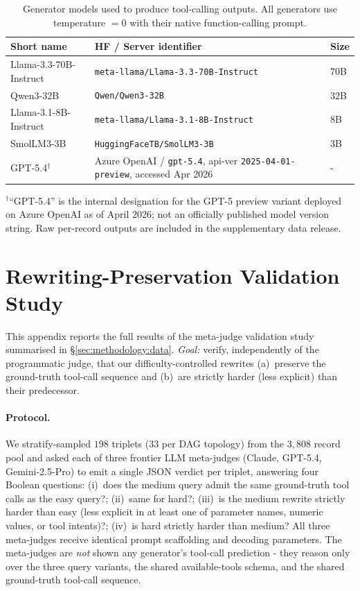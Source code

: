 \begin{table}[!htbp]
\centering
\caption{Generator models used to produce tool-calling outputs. All generators use temperature $=0$ with their native function-calling prompt.}
\label{tab:generators}
\small
\renewcommand{\arraystretch}{1.1}
\setlength{\tabcolsep}{5pt}
\begin{tabular}{@{}lll@{}}
\toprule
\textbf{Short name} & \textbf{HF / Server identifier} & \textbf{Size} \\
\midrule
Llama-3.3-70B-Instruct & \texttt{meta-llama/Llama-3.3-70B-Instruct} & 70B \\
Qwen3-32B              & \texttt{Qwen/Qwen3-32B}                   & 32B \\
Llama-3.1-8B-Instruct  & \texttt{meta-llama/Llama-3.1-8B-Instruct} & 8B  \\
SmolLM3-3B             & \texttt{HuggingFaceTB/SmolLM3-3B}         & 3B  \\
GPT-5.4$^{\dagger}$    & Azure OpenAI / \texttt{gpt-5.4}, api-ver \texttt{2025-04-01-preview}, accessed Apr 2026 & - \\
\bottomrule
\end{tabular}
\begin{flushleft}
\footnotesize $^{\dagger}$``GPT-5.4'' is the internal designation for the GPT-5 preview variant deployed on Azure OpenAI as of April 2026; not an officially published model version string. Raw per-record outputs are included in the supplementary data release.
\end{flushleft}
\end{table}

\section{Rewriting-Preservation Validation Study}
\label{app:rewrite-validation}

This appendix reports the full results of the meta-judge validation study summarised in \S\ref{sec:methodology:data}. \emph{Goal:} verify, independently of the programmatic judge, that our difficulty-controlled rewrites (a)~preserve the ground-truth tool-call sequence and (b)~are strictly harder (less explicit) than their predecessor.

\paragraph{Protocol.} We stratify-sampled $198$ triplets ($33$ per DAG topology) from the $3{,}808$ record pool and asked each of three frontier LLM meta-judges (Claude, GPT-5.4, Gemini-2.5-Pro) to emit a single JSON verdict per triplet, answering four Boolean questions: (i)~does the medium query admit the same ground-truth tool calls as the easy query?; (ii)~same for hard?; (iii)~is the medium rewrite strictly harder than easy (less explicit in at least one of parameter names, numeric values, or tool intents)?; (iv)~is hard strictly harder than medium? All three meta-judges receive identical prompt scaffolding and decoding parameters. The meta-judges are \emph{not} shown any generator's tool-call prediction - they reason only over the three query variants, the shared available-tools schema, and the shared ground-truth tool-call sequence.

